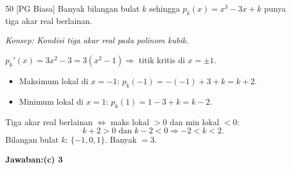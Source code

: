 \documentclass[11pt]{article}
\newcommand{\jawaban}[1]{\textbf{Jawaban:}\enspace\colorbox{gold!30}{\textbf{#1}}}
\newcommand{\konsep}[1]{\textit{Konsep: #1.}}
\begin{document}
\begin{soal}{50 \normalfont\small[PG Biasa]}
Banyak bilangan bulat $k$ sehingga $p_k(x)=x^3-3x+k$ punya tiga akar real berlainan.
\end{soal}
\begin{pembox}
\konsep{Kondisi tiga akar real pada polinom kubik}

$p_k'(x)=3x^2-3=3(x^2-1)\Rightarrow$ titik kritis di $x=\pm1$.

\begin{itemize}[leftmargin=*,nosep]
  \item Maksimum lokal di $x=-1$: $p_k(-1)=-(-1)+3+k=k+2$.
  \item Minimum lokal di $x=1$: $p_k(1)=1-3+k=k-2$.
\end{itemize}

Tiga akar real berlainan $\Leftrightarrow$ maks lokal $>0$ dan min lokal $<0$:
\[
k+2>0\text{ dan }k-2<0\Rightarrow -2<k<2.
\]
Bilangan bulat $k$: $\{-1,0,1\}$. Banyak $=3$.

\jawaban{(c) 3}
\end{pembox}
\end{document}
